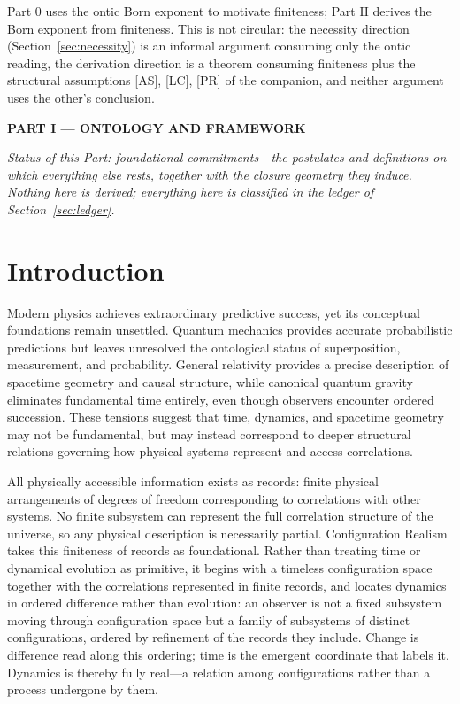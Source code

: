 \documentclass[11pt]{article}
\theoremstyle{definition}
\theoremstyle{remark}
\newcommand{\partheader}[1]{\clearpage\begin{center}{\LARGE\bfseries #1}\end{center}\vspace{1em}}
\begin{document}
Part 0 uses the ontic Born exponent to motivate finiteness; Part II derives the Born exponent from finiteness. This is not circular: the necessity direction (Section~\ref{sec:necessity}) is an informal argument consuming only the ontic reading, the derivation direction is a theorem consuming finiteness plus the structural assumptions [AS], [LC], [PR] of the companion, and neither argument uses the other's conclusion.

\partheader{PART I --- ONTOLOGY AND FRAMEWORK}
\emph{Status of this Part: foundational commitments---the postulates and definitions on which everything else rests, together with the closure geometry they induce. Nothing here is derived; everything here is classified in the ledger of Section~\ref{sec:ledger}.}

\section{Introduction}\label{sec:intro}
Modern physics achieves extraordinary predictive success, yet its conceptual foundations remain unsettled. Quantum mechanics provides accurate probabilistic predictions but leaves unresolved the ontological status of superposition, measurement, and probability. General relativity provides a precise description of spacetime geometry and causal structure, while canonical quantum gravity eliminates fundamental time entirely, even though observers encounter ordered succession. These tensions suggest that time, dynamics, and spacetime geometry may not be fundamental, but may instead correspond to deeper structural relations governing how physical systems represent and access correlations.

All physically accessible information exists as records: finite physical arrangements of degrees of freedom corresponding to correlations with other systems. No finite subsystem can represent the full correlation structure of the universe, so any physical description is necessarily partial. Configuration Realism takes this finiteness of records as foundational. Rather than treating time or dynamical evolution as primitive, it begins with a timeless configuration space together with the correlations represented in finite records, and locates dynamics in ordered difference rather than evolution: an observer is not a fixed subsystem moving through configuration space but a family of subsystems of distinct configurations, ordered by refinement of the records they include. Change is difference read along this ordering; time is the emergent coordinate that labels it. Dynamics is thereby fully real---a relation among configurations rather than a process undergone by them.
\end{document}
